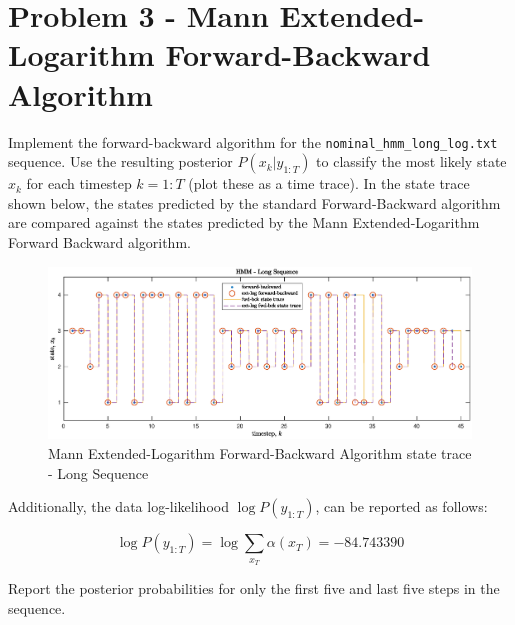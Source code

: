 \documentclass[]{article}
\begin{document}
\section*{Problem 3 - Mann Extended-Logarithm Forward-Backward Algorithm}

Implement the forward-backward algorithm for the \texttt{nominal\_hmm\_long\_log.txt} sequence. Use the resulting posterior $P(x_k \vert y_{1:T})$ to classify the most likely state $x_k$ for each timestep $k=1:T$ (plot these as a time trace). In the state trace shown below, the states predicted by the standard Forward-Backward algorithm are compared against the states predicted by the Mann Extended-Logarithm Forward Backward algorithm.

\begin{figure}[H]
	\begin{center}  
		\includegraphics[scale=0.53]{p3_state_trace.eps}  
		\caption{Mann Extended-Logarithm Forward-Backward Algorithm state trace - Long Sequence}
		\label{fig:short_fb}
	\end{center}  
\end{figure}

Additionally, the data log-likelihood $\log P(y_{1:T})$, can be reported as follows:

\begin{equation}
	\log P(y_{1:T}) = \log \sum_{x_T} \alpha(x_T) = -84.743390
\end{equation}

\newpage
Report the posterior probabilities for only the first five and last five steps in the sequence.
\end{document}
